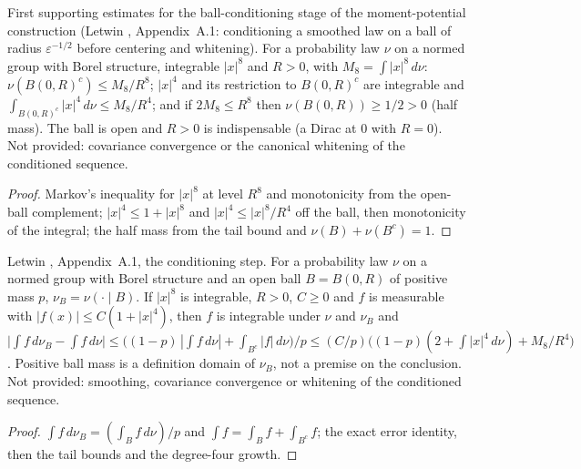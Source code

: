 \begin{lemma}
  \label{lem:moment-tails-eighth}
  \leanok
  First supporting estimates for the ball-conditioning stage of the moment-potential construction (Letwin \cite{Letwin2026QuadraticKLS},
  Appendix~A.1: conditioning a smoothed law on a ball of radius $\varepsilon^{-1/2}$ before centering and
  whitening).  For a probability law $\nu$ on a normed group with Borel structure, integrable $|x|^8$ and $R>0$,
  with $M_8=\int|x|^8\,d\nu$: $\nu(B(0,R)^c)\le M_8/R^8$; $|x|^4$ and its restriction to $B(0,R)^c$ are integrable and
  $\int_{B(0,R)^c}|x|^4\,d\nu\le M_8/R^4$; and if $2M_8\le R^8$ then $\nu(B(0,R))\ge 1/2>0$ (half mass).  The ball is
  open and $R>0$ is indispensable (a Dirac at $0$ with $R=0$).  Not provided: covariance convergence or the canonical
  whitening of the conditioned sequence.
\end{lemma}
\begin{proof}
  \leanok
  Markov's inequality for $|x|^8$ at level $R^8$ and monotonicity from the open-ball complement; $|x|^4\le1+|x|^8$ and
  $|x|^4\le|x|^8/R^4$ off the ball, then monotonicity of the integral; the half mass from the tail bound and
  $\nu(B)+\nu(B^c)=1$.
\end{proof}

\begin{lemma}
  \label{lem:ball-conditioning}
  \leanok
  Letwin \cite{Letwin2026QuadraticKLS}, Appendix~A.1, the conditioning step.  For a probability law $\nu$ on a normed group with
  Borel structure and an open ball $B=B(0,R)$ of positive mass $p$, $\nu_B=\nu(\cdot\mid B)$.  If $|x|^8$ is integrable,
  $R>0$, $C\ge0$ and $f$ is measurable with $|f(x)|\le C(1+|x|^4)$, then $f$ is integrable under $\nu$ and $\nu_B$ and
  $\big|\int f\,d\nu_B-\int f\,d\nu\big|\le\big((1-p)\,|\int f\,d\nu|+\int_{B^c}|f|\,d\nu\big)/p
  \le (C/p)\big((1-p)(2+\int|x|^4\,d\nu)+M_8/R^4\big)$.  Positive ball mass is a definition domain of $\nu_B$, not a
  premise on the conclusion.  Not provided: smoothing, covariance convergence or whitening of the conditioned sequence.
\end{lemma}
\begin{proof}
  \leanok
  $\int f\,d\nu_B=(\int_B f\,d\nu)/p$ and $\int f=\int_B f+\int_{B^c}f$; the exact error identity, then the tail bounds
  and the degree-four growth.
\end{proof}

